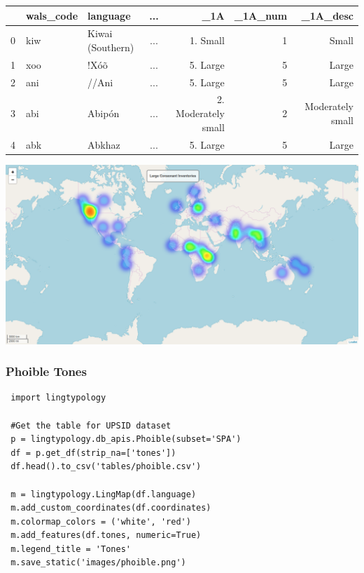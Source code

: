 \documentclass[a4paper,12pt]{article}
\begin{document}
\noindent
\begin{minipage}{\textwidth}
\begin{adjustbox}{max width=\textwidth}
\begin{tabular}{ l | l | l | c | r | r | r }
    ~ & wals\_code & language & ... & \_1A & \_1A\_num & \_1A\_desc \\
    \hline
    0 & kiw &  Kiwai (Southern) & ... & 1. Small & 1 & Small \\
    1 & xoo & !Xóõ & ... & 5. Large & 5 & Large \\
    2 & ani & //Ani & ... & 5. Large & 5 & Large \\
    3 & abi & Abipón & ... & 2. Moderately small & 2 & Moderately small \\
    4 & abk & Abkhaz & ... & 5. Large & 5 & Large \\
\end{tabular}
\end{adjustbox}
\end{minipage}
\bigskip

\noindent
\begin{minipage}{\textwidth}
\includegraphics[width=\textwidth]{images/WalsHeatMap.png}
\end{minipage}

\subsubsection{Phoible Tones}

\noindent
\begin{minipage}{\textwidth}
\begin{lstlisting}
 import lingtypology

 #Get the table for UPSID dataset
 p = lingtypology.db_apis.Phoible(subset='SPA')
 df = p.get_df(strip_na=['tones'])
 df.head().to_csv('tables/phoible.csv')
 
 m = lingtypology.LingMap(df.language)
 m.add_custom_coordinates(df.coordinates)
 m.colormap_colors = ('white', 'red')
 m.add_features(df.tones, numeric=True)
 m.legend_title = 'Tones'
 m.save_static('images/phoible.png')
\end{lstlisting}
\end{minipage}
\end{document}
